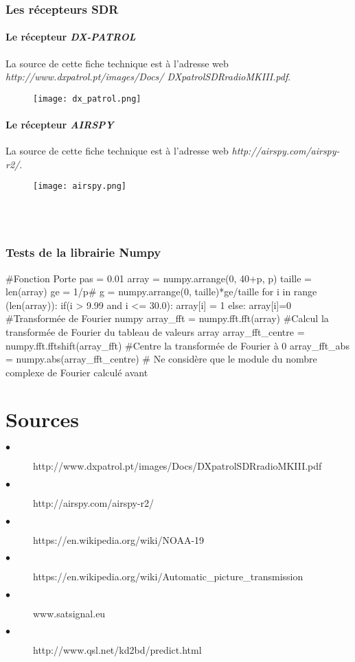 \documentclass[12pt,fleqn]{book} %
\begin{document}
\section{Les récepteurs SDR}
\subsection{Le récepteur \emph{DX-PATROL}}
La source de cette fiche technique est à l'adresse web \emph{http://www.dxpatrol.pt/images/Docs/ DXpatrolSDRradioMKIII.pdf}.
\begin{figure}[H]
	\centering
	\texttt{[image: dx\_patrol.png]}
 \end{figure}
\subsection{Le récepteur \emph{AIRSPY}}
La source de cette fiche technique est à l'adresse web \emph{http://airspy.com/airspy-r2/}.
 \begin{figure}[H]
	\centering
	\texttt{[image: airspy.png]}
 \end{figure}
~\\\\
\section{Tests de la librairie Numpy}
\begin{python}
 #Fonction Porte
 pas = 0.01
 array = numpy.arrange(0, 40+p, p)
 taille = len(array)
 ge = 1/p#
 g = numpy.arrange(0, taille)*ge/taille
 for i in range (len(array)):
     if(i > 9.99 and i <= 30.0):
          array[i] = 1
      else:
          array[i]=0
 #Transformée de Fourier numpy
 array_fft = numpy.fft.fft(array) #Calcul la transformée de Fourier du tableau de valeurs array
 array_fft_centre = numpy.fft.fftshift(array_fft) #Centre la transformée de Fourier à 0
 array_fft_abs = numpy.abs(array_fft_centre) # Ne considère que le module du nombre complexe de Fourier calculé avant
\end{python}
\setcounter{part}{-6}
\part{Sources}

\appendix

\begin{description}
\item[$\bullet$] http://www.dxpatrol.pt/images/Docs/DXpatrolSDRradioMKIII.pdf
\item[$\bullet$] http://airspy.com/airspy-r2/
\item[$\bullet$] https://en.wikipedia.org/wiki/NOAA-19
\item[$\bullet$] https://en.wikipedia.org/wiki/Automatic\_picture\_transmission
\item[$\bullet$] www.satsignal.eu
\item[$\bullet$] http://www.qsl.net/kd2bd/predict.html
\end{description} 
\end{document}
